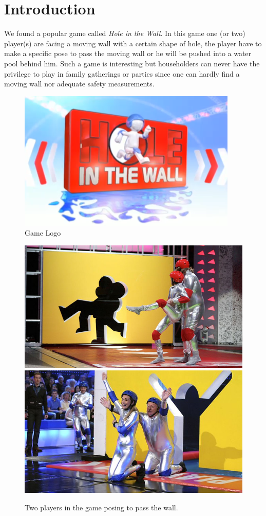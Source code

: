 \documentclass[11pt,twocolumn,letterpaper]{article}
\begin{document}
\section{Introduction}
    \par We found a popular game called \textit{Hole in the Wall}. In this game one (or two) player(s) are facing a moving wall with a certain shape of hole, the player have to make a specific pose to pass the moving wall or he will be pushed into a water pool behind him. Such a game is interesting but householders can never have the privilege to play in family gatherings or parties since one can hardly find a moving wall nor adequate safety measurements.
        \begin{figure}[h]
            \centering
            \includegraphics[width=0.8\linewidth]{./Pic/HIW_Logo}
            \caption{Game Logo}
        \end{figure}
        \begin{figure}[h]
            \centering
            \includegraphics[width=0.45\linewidth]{./Pic/HIW_RedTeam}
            \includegraphics[width=0.45\linewidth]{./Pic/HIW_BlueTeam}
            \caption{Two players in the game posing to pass the wall.}
        \end{figure}
\end{document}
